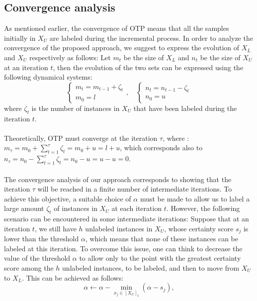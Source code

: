 \documentclass[conference]{IEEEtran}
\begin{document}
\subsection{Convergence analysis }
As mentioned earlier, the convergence of OTP means that all the samples initially in $X_U$ are labeled during the incremental process. In order to analyze the convergence of the proposed approach, we suggest to express the evolution of  $X_L$ and $X_U$ respectively as follows: Let $m_t$ be the size of $X_L$ and $n_t$ be the size of $X_U$ at an iteration $t$, then the evolution of the two sets can be expressed using the following dynamical systems:
\begin{equation} 
\begin{cases} 
m_t  = m_{t-1} + \zeta_t\\
m_0 = l 
\end{cases},  
\quad 
\begin{cases} 
n_t = n_{t-1} - \zeta_t\\
n_0 = u 
\end{cases}   
\end{equation}
where $\zeta_t$ is the number of instances in $X_U$ that have been labeled during the iteration $t$.
\\
\\ Theoretically, OTP must converge at the iteration $\tau$, where : $m_{\tau} = m_0 + \sum_{t=1}^{\tau} \zeta_t = m_0 + u =l + u$, which corresponds also to $n_{\tau} = n_0 - \sum_{t=1}^{\tau}  \zeta_t = n_0 - u = u -u= 0$.
\\
\\The convergence analysis of our approach corresponds to showing that the iteration $\tau$ will be reached in a finite number of intermediate iterations. To achieve this objective, a suitable choice of $\alpha$ must be made to allow us to label a large amount $\zeta_t$ of instances in $X_U$ at each iteration $t$. However, the following scenario can be encountered in some intermediate iterations: Suppose that at an iteration $t$, we still have $h$ unlabeled instances in $X_U$, whose certainty score $s_j$ is lower than the threshold $\alpha$,
which means that none of these instances can be labeled at this iteration. To overcome this issue, one can think to decrease the value of the threshold $\alpha$ to allow only to the point with the greatest certainty score among the $h$ unlabeled instances, to be labeled, and then to move from $X_U$ to $X_L$. This can be achieved as follows:
\begin{equation}
    \alpha \leftarrow \alpha - \min_{x_j \in [X_U]_t}  (\alpha - s_j),
\end{equation}
\end{document}
